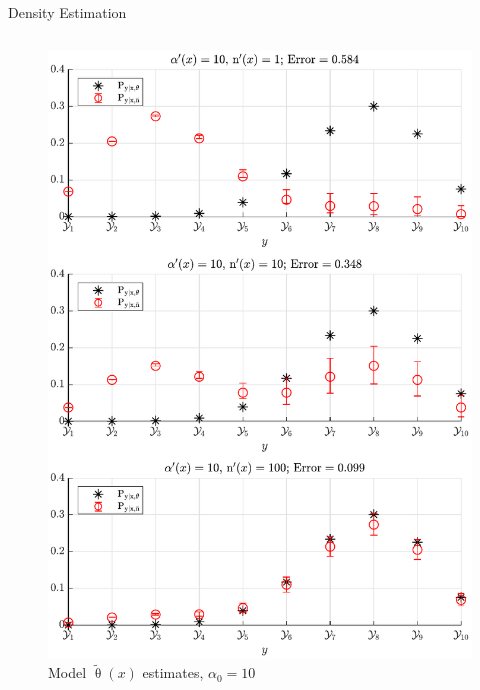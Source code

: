 \documentclass[final]{beamer}
\begin{document}
\begin{frame}{}
\begin{columns}[t]
\begin{column}{.32\linewidth}
\begin{block}{Density Estimation}
\begin{columns}[t]
\begin{column}{.5\linewidth}
\begin{figure}
\centering
\includegraphics[width=0.9\linewidth]{P_yx_error_a0_10.pdf}
\caption{Model $\tilde{\uptheta}(x)$ estimates, $\alpha_0 = 10$}
\label{fig:P_yx_error_a0_10}
\end{figure}

\end{column}
\end{columns}



\end{block}  
    
\end{column}




\end{columns}


\end{frame}
\end{document}
